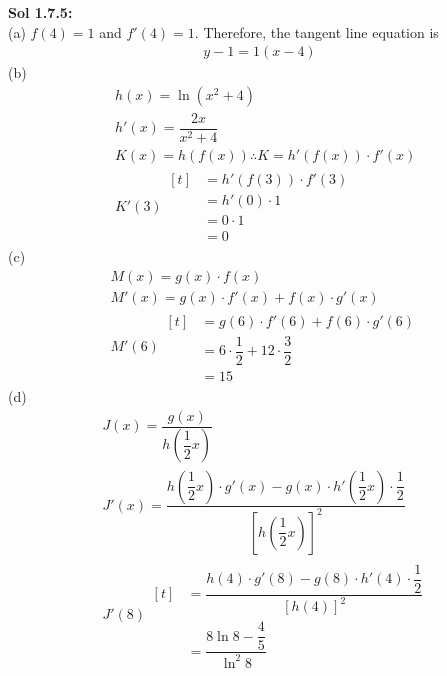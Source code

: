 \begin{tcolorbox}[solution]
    \textbf{Sol 1.7.5: } \\[11pt]
    (a) $f(4) = 1$ and $f'(4) = 1$. Therefore, the tangent line equation is \begin{align*}
        \boxed{y - 1 = 1(x - 4)}
    \end{align*}
    (b) \begin{align*}
        & h(x) = \ln \left(x^2 + 4\right) \\[11pt]
        & h'(x) = \dfrac{2x}{x^2 + 4} \\[11pt]
        & K(x) = h(f(x)) \therefore K = h'(f(x)) \cdot f'(x) \\[11pt]
        & K'(3) \begin{aligned}[t]
            & = h'(f(3)) \cdot f'(3) \\[11pt]
            & = h'(0) \cdot 1 \\[11pt]
            & = 0 \cdot 1 \\[11pt]
            & = \boxed{0}
        \end{aligned}
    \end{align*}
    (c) \begin{align*}
        & M(x) = g(x) \cdot f(x) \\[11pt]
        & M'(x) = g(x) \cdot f'(x) + f(x) \cdot g'(x) \\[11pt]
        & M'(6) \begin{aligned}[t]
            & = g(6) \cdot f'(6) + f(6) \cdot g'(6) \\[11pt]
            & = 6 \cdot \dfrac{1}{2} + 12 \cdot \dfrac{3}{2} \\[11pt]
            & = \boxed{15}
        \end{aligned}
    \end{align*}
    (d) \begin{align*}
        & J(x) = \dfrac{g(x)}{h\left(\dfrac{1}{2}x\right)} \\[11pt]
        & J'(x) = \dfrac{h\left(\dfrac{1}{2}x\right) \cdot g'(x) - g(x) \cdot h'\left(\dfrac{1}{2}x\right) \cdot \dfrac{1}{2}}{\left[h\left(\dfrac{1}{2}x\right)\right]^2} \\[11pt]
        & J'(8) \begin{aligned}[t]
            & = \dfrac{h(4) \cdot g'(8) - g(8) \cdot h'(4) \cdot \dfrac{1}{2}}{\left[h(4)\right]^2} \\[11pt]
            & = \boxed{\dfrac{8\ln 8 - \dfrac{4}{5}}{\ln^2 8}}
        \end{aligned}
    \end{align*}
\end{tcolorbox}

